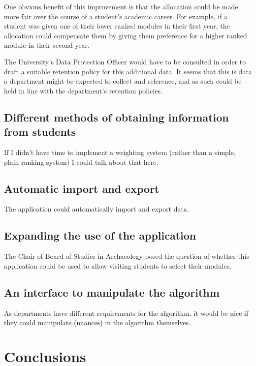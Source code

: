 \documentclass[]{scrartcl}
\begin{document}
One obvious benefit of this improvement is that the allocation could be made
more fair over the course of a student's academic career. For example, if a
student was given one of their lower ranked modules in their first year, the
allocation could compensate them by giving them preference for a higher ranked
module in their second year.

The University's Data Protection Officer would have to be consulted in order
to draft a suitable retention policy for this additional data. It seems that
this is data a department might be expected to collect and reference, and as
such could be held in line with the department's retention policies.

\subsection{Different methods of obtaining information from students}

If I didn't have time to implement a weighting system (rather than a simple,
plain ranking system) I could talk about that here.


\subsection{Automatic import and export}
\label{sec:autoexport}

The application could automatically import and export data.

\subsection{Expanding the use of the application}

The Chair of Board of Studies in Archaeology posed the question of whether
this application could be used to allow visiting students to select their
modules.

\subsection{An interface to manipulate the algorithm}

As departments have different requirements for the algorithm, it would be nice
if they could manipulate (nuances) in the algorithm themselves.

\section{Conclusions}
\label{sec:conclusions}
\end{document}
